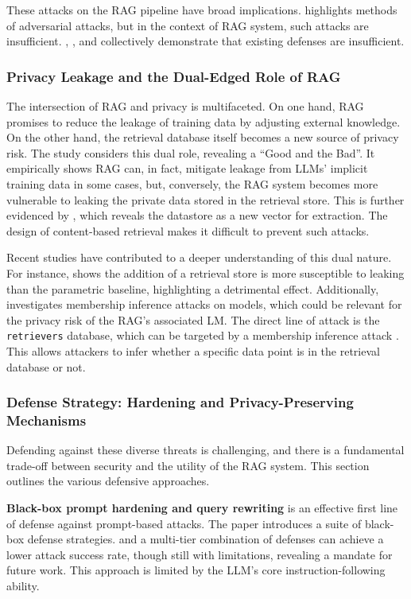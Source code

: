 \documentclass[11pt]{article}
\begin{document}
These attacks on the RAG pipeline have broad implications. \cite{ref270} highlights methods of adversarial attacks, but in the context of RAG system, such attacks are insufficient. \cite{ref271}, \cite{ref272}, and \cite{ref256} collectively demonstrate that existing defenses are insufficient.

\subsubsection{Privacy Leakage and the Dual-Edged Role of RAG}

The intersection of RAG and privacy is multifaceted. On one hand, RAG promises to reduce the leakage of training data by adjusting external knowledge. On the other hand, the retrieval database itself becomes a new source of privacy risk. The study \cite{ref273} considers this dual role, revealing a ``Good and the Bad''. It empirically shows RAG can, in fact, mitigate leakage from LLMs' implicit training data in some cases, but, conversely, the RAG system becomes more vulnerable to leaking the private data stored in the retrieval store. This is further evidenced by \cite{ref274}, which reveals the datastore as a new vector for extraction. The design of content-based retrieval makes it difficult to prevent such attacks.

Recent studies have contributed to a deeper understanding of this dual nature. For instance, \cite{ref275} shows the addition of a retrieval store is more susceptible to leaking than the parametric baseline, highlighting a detrimental effect. Additionally, \cite{ref276} investigates membership inference attacks on models, which could be relevant for the privacy risk of the RAG's associated LM. The direct line of attack is the \texttt{retriever\textquotesingle{}s} database, which can be targeted by a membership inference attack \cite{ref277}. This allows attackers to infer whether a specific data point is in the retrieval database or not.

\subsubsection{Defense Strategy: Hardening and Privacy-Preserving Mechanisms}

Defending against these diverse threats is challenging, and there is a fundamental trade-off between security and the utility of the RAG system. This section outlines the various defensive approaches.

\textbf{Black-box prompt hardening and query rewriting} is an effective first line of defense against prompt-based attacks. The \cite{ref269} paper introduces a suite of black-box defense strategies. \cite{ref278} and a multi-tier combination of defenses can achieve a lower attack success rate, though still with limitations, revealing a mandate for future work. This approach is limited by the LLM's core instruction-following ability.
\end{document}
